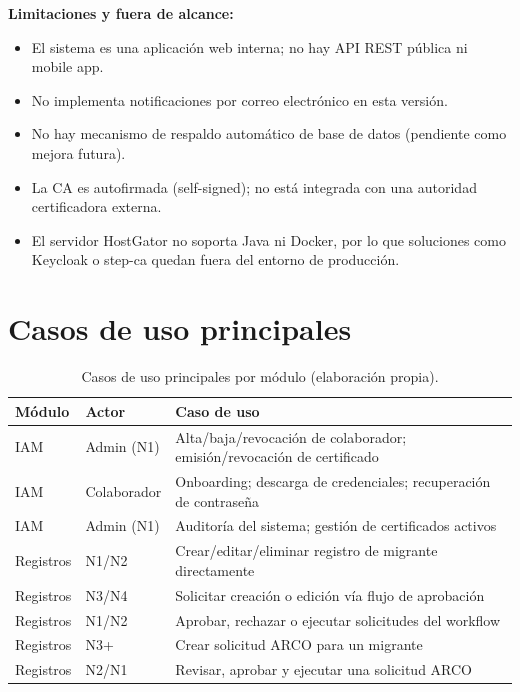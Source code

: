 \documentclass[10pt,letterpaper]{report}
\begin{document}
\textbf{Limitaciones y fuera de alcance:}
\begin{itemize}[leftmargin=*]
    \item El sistema es una aplicación web interna; no hay API REST pública ni mobile app.
    \item No implementa notificaciones por correo electrónico en esta versión.
    \item No hay mecanismo de respaldo automático de base de datos (pendiente como mejora futura).
    \item La CA es autofirmada (self-signed); no está integrada con una autoridad certificadora externa.
    \item El servidor HostGator no soporta Java ni Docker, por lo que soluciones como Keycloak o step-ca quedan fuera del entorno de producción.
\end{itemize}

\section{Casos de uso principales}

\begin{table}[h!]
\centering
\caption{Casos de uso principales por módulo (elaboración propia).}
\label{tab:casosuso}
\begin{tabularx}{\textwidth}{l l X}
\toprule
\textbf{Módulo} & \textbf{Actor} & \textbf{Caso de uso} \\
\midrule
IAM & Admin (N1) & Alta/baja/revocación de colaborador; emisión/revocación de certificado \\
IAM & Colaborador & Onboarding; descarga de credenciales; recuperación de contraseña \\
IAM & Admin (N1) & Auditoría del sistema; gestión de certificados activos \\
Registros & N1/N2 & Crear/editar/eliminar registro de migrante directamente \\
Registros & N3/N4 & Solicitar creación o edición vía flujo de aprobación \\
Registros & N1/N2 & Aprobar, rechazar o ejecutar solicitudes del workflow \\
Registros & N3+ & Crear solicitud ARCO para un migrante \\
Registros & N2/N1 & Revisar, aprobar y ejecutar una solicitud ARCO \\
\bottomrule
\end{tabularx}
\end{table}
\end{document}
